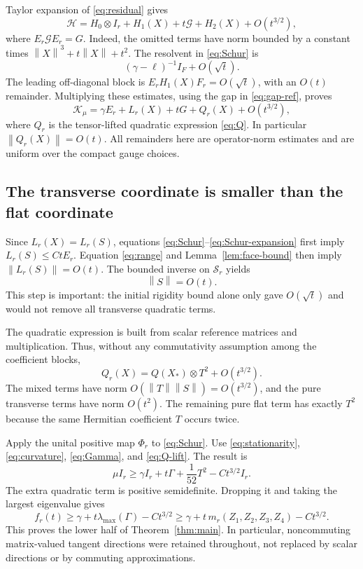 \documentclass[11pt]{article}
\theoremstyle{remark}\newtheorem{remark}[theorem]{Remark}
\newcommand{\norm}[1]{\left\lVert#1\right\rVert}
\newcommand{\trans}{\mathcal S}
\begin{document}
Taylor expansion of \eqref{eq:residual} gives
\[
 \mathcal H=H_0\otimes I_r+H_1(X)+t\mathcal G+H_2(X)+O(t^{3/2}),
\]
where $E_r\mathcal G E_r=G$. Indeed, the omitted terms have norm bounded by a constant times $\norm X^3+t\norm X+t^2$. The resolvent in \eqref{eq:Schur} is
\[
 (\gamma-\ell)^{-1}I_F+O(\sqrt t).
\]
The leading off-diagonal block is $E_rH_1(X)F_r=O(\sqrt t)$, with an $O(t)$ remainder. Multiplying these estimates, using the gap in \eqref{eq:gap-ref}, proves
\begin{equation}\label{eq:Schur-expansion}
 \mathcal K_\mu=\gamma E_r+L_r(X)+tG+Q_r(X)+O(t^{3/2}),
\end{equation}
where $Q_r$ is the tensor-lifted quadratic expression \eqref{eq:Q}. In particular $\norm{Q_r(X)}=O(t)$. All remainders here are operator-norm estimates and are uniform over the compact gauge choices.

\subsection{The transverse coordinate is smaller than the flat coordinate}
Since $L_r(X)=L_r(S)$, equations \eqref{eq:Schur}--\eqref{eq:Schur-expansion} first imply $L_r(S)\le CtE_r$. Equation \eqref{eq:range} and Lemma~\ref{lem:face-bound} then imply $\norm{L_r(S)}=O(t)$. The bounded inverse on $\trans_r$ yields
\begin{equation}\label{eq:S-rate}
 \norm S=O(t).
\end{equation}
This step is important: the initial rigidity bound alone only gave $O(\sqrt t)$ and would not remove all transverse quadratic terms.

The quadratic expression is built from scalar reference matrices and multiplication. Thus, without any commutativity assumption among the coefficient blocks,
\begin{equation}\label{eq:Q-lift}
 Q_r(X)=Q(X_*)\otimes T^2+O(t^{3/2}).
\end{equation}
The mixed terms have norm $O(\norm T\norm S)=O(t^{3/2})$, and the pure transverse terms have norm $O(t^2)$. The remaining pure flat term has exactly $T^2$ because the same Hermitian coefficient $T$ occurs twice.

Apply the unital positive map $\Phi_r$ to \eqref{eq:Schur}. Use \eqref{eq:stationarity}, \eqref{eq:curvature}, \eqref{eq:Gamma}, and \eqref{eq:Q-lift}. The result is
\begin{equation}\label{eq:key-lower}
 \mu I_r\ge\gamma I_r+t\Gamma+\frac1{52}T^2-Ct^{3/2}I_r.
\end{equation}
The extra quadratic term is positive semidefinite. Dropping it and taking the largest eigenvalue gives
\[
 f_r(t)\ge\gamma+t\lambda_{\max}(\Gamma)-Ct^{3/2}
 \ge\gamma+t\,m_r(Z_1,Z_2,Z_3,Z_4)-Ct^{3/2}.
\]
This proves the lower half of Theorem~\ref{thm:main}. In particular, noncommuting matrix-valued tangent directions were retained throughout, not replaced by scalar directions or by commuting approximations.
\end{document}
